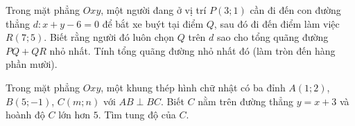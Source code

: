 \begin{bt}%
	Trong mặt phẳng $Oxy$, một người đang ở vị trí $P(3;1)$ cần đi đến con đường thẳng $d\colon x+y-6=0$ để bắt xe buýt tại điểm $Q$, sau đó đi đến điểm làm việc $R(7;5)$. Biết rằng người đó luôn chọn $Q$ trên $d$ sao cho tổng quãng đường $PQ+QR$ nhỏ nhất. Tính tổng quãng đường nhỏ nhất đó (làm tròn đến hàng phần mười).
	
\end{bt}

\begin{bt}%
	Trong mặt phẳng $Oxy$, một khung thép hình chữ nhật có ba đỉnh $A(1;2)$, $B(5;-1)$, $C(m;n)$ với $AB\perp BC$. Biết $C$ nằm trên đường thẳng $y=x+3$ và hoành độ $C$ lớn hơn $5$. Tìm tung độ của $C$.
	
\end{bt}

